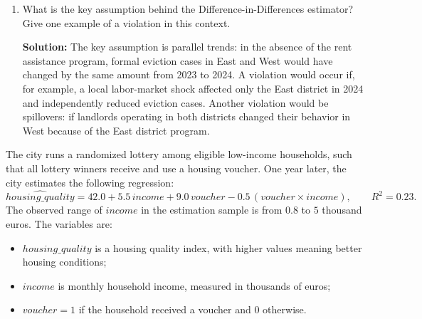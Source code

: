 \documentclass[11pt]{exam}
\begin{document}
\begin{questions}
\begin{enumerate}[leftmargin = 0.5cm, label = (\alph*), rightmargin = 0.2cm]
\begin{solutionorbox}[3.5cm]
    \end{solutionorbox}
    \begin{solutionorbox}[6.5cm]
    \textbf{Solution:} The change in the East district is
    \[
    13-18=-5.
    \]
    The change in the West district is
    \[
    10-12=-2.
    \]
    Therefore,
    \[
    \widehat{SATE}_{DiD}=(13-18)-(10-12)=-5-(-2)=-3.
    \]
    Interpretation: after adjusting for the time trend observed in the West district, the rent assistance program is estimated to reduce formal eviction cases by 3 per 1,000 renter households.
    \end{solutionorbox}

    \item What is the key assumption behind the Difference-in-Differences estimator? Give one example of a violation in this context.

    \begin{solutionorbox}[7cm]
    \textbf{Solution:} The key assumption is parallel trends: in the absence of the rent assistance program, formal eviction cases in East and West would have changed by the same amount from 2023 to 2024. A violation would occur if, for example, a local labor-market shock affected only the East district in 2024 and independently reduced eviction cases. Another violation would be spillovers: if landlords operating in both districts changed their behavior in West because of the East district program.
    \end{solutionorbox}
\end{enumerate}

\newpage
\question[5]
The city runs a randomized lottery among eligible low-income households, such that all lottery winners receive and use a housing voucher. One year later, the city estimates the following regression:
\[
\widehat{housing\_quality}=42.0+5.5\,income+9.0\,voucher-0.5\,(voucher\times income),\qquad R^2=0.23.
\]
The observed range of $income$ in the estimation sample is from $0.8$ to $5$ thousand euros. The variables are:
\begin{itemize}[leftmargin = 0.6cm]
    \item $housing\_quality$ is a housing quality index, with higher values meaning better housing conditions;
    \item $income$ is monthly household income, measured in thousands of euros;
    \item $voucher=1$ if the household received a voucher and $0$ otherwise.
\end{itemize}


\end{questions}
\end{document}
